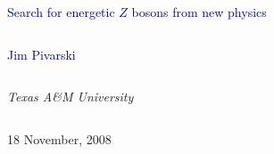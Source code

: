 \documentclass[compress]{beamer}
\begin{document}
\begin{frame}
\vfill
\begin{center}
\textcolor{darkblue}{\Large Search for energetic $Z$ bosons from new physics}

\vfill
\begin{columns}
\begin{center}
\large
\textcolor{darkblue}{Jim Pivarski}
\end{center}
\end{columns}

\begin{columns}
\begin{center}
\scriptsize
{\it Texas A\&M University}
\end{center}
\end{columns}

\vfill
18 November, 2008

\end{center}
\end{frame}


\small
\end{document}
